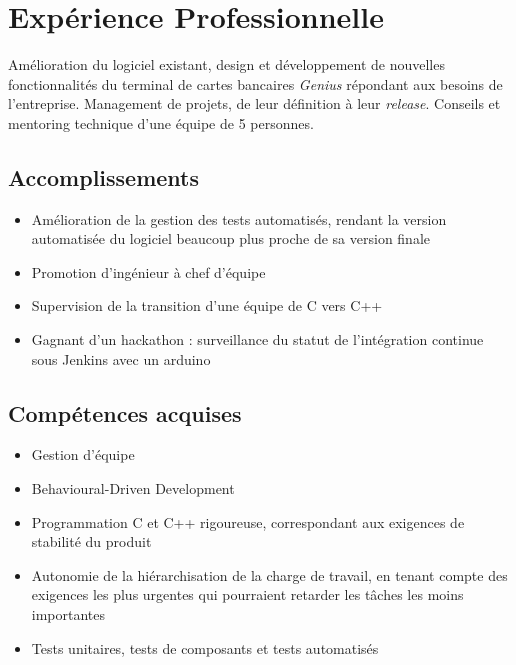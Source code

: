 \documentclass{cv}
\begin{document}
\iffalse
\contact{adresse ligne 1}
        {adresse ligne 2}
        {adresse ligne 3}
        {.....@.........}
        {+phone~number}
\fi

\section{Expérience Professionnelle}
{Amélioration du logiciel existant, design et développement de nouvelles fonctionnalités du terminal de cartes bancaires \textit{Genius} répondant aux besoins de l'entreprise. Management de projets, de leur définition à leur \textit{release}. Conseils et mentoring technique d'une équipe de 5 personnes.}
\subsection{Accomplissements}
\begin{itemize}
    \item {Amélioration de la gestion des tests automatisés, rendant la version automatisée du logiciel beaucoup plus proche de sa version finale}
    \item {Promotion d'ingénieur à chef d'équipe}
    \item {Supervision de la transition d'une équipe de C vers C++}
    \item {Gagnant d'un hackathon : surveillance du statut de l'intégration continue sous Jenkins avec un arduino}
\end{itemize}
\subsection{Compétences acquises}
\begin{itemize}
    \item {Gestion d'équipe}
    \item {Behavioural-Driven Development}
    \item {Programmation C et C++ rigoureuse, correspondant aux exigences de stabilité du produit}
    \item {Autonomie de la hiérarchisation de la charge de travail, en tenant compte des exigences les plus urgentes qui pourraient retarder les tâches les moins importantes}
    \item {Tests unitaires, tests de composants et tests automatisés}
\end{itemize}
\end{document}
